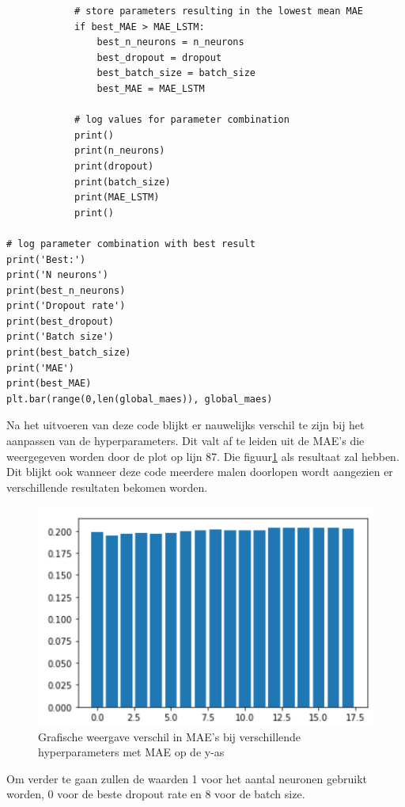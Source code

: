 \begin{verbatim}
            # store parameters resulting in the lowest mean MAE
            if best_MAE > MAE_LSTM:
                best_n_neurons = n_neurons
                best_dropout = dropout
                best_batch_size = batch_size
                best_MAE = MAE_LSTM
            
            # log values for parameter combination
            print()
            print(n_neurons)
            print(dropout)
            print(batch_size)
            print(MAE_LSTM)
            print()    

# log parameter combination with best result
print('Best:')
print('N neurons')
print(best_n_neurons)
print('Dropout rate')
print(best_dropout)
print('Batch size')
print(best_batch_size)
print('MAE')
print(best_MAE)
plt.bar(range(0,len(global_maes)), global_maes)
\end{verbatim}

Na het uitvoeren van deze code blijkt er nauwelijks verschil te zijn bij het aanpassen van de hyperparameters. Dit valt af te leiden uit de MAE's die weergegeven worden door de plot op lijn 87. Die figuur\ref{fig:uvnslstmbar} als resultaat zal hebben.
Dit blijkt ook wanneer deze code meerdere malen doorlopen wordt aangezien er verschillende resultaten bekomen worden.

\begin{figure}
    \centering
    \caption{Grafische weergave verschil in MAE's bij verschillende hyperparameters met MAE op de y-as}
    \label{fig:uvnslstmbar}
    \includegraphics[width=1\linewidth]{uv_ns_LSTM_bar}
\end{figure}

Om verder te gaan zullen de waarden 1 voor het aantal neuronen gebruikt worden, 0 voor de beste dropout rate en 8 voor de batch size. 

